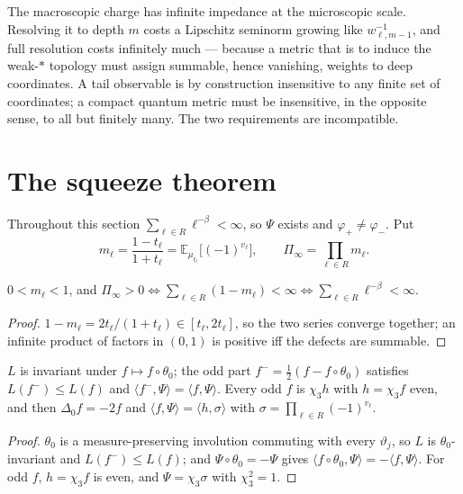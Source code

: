 \begin{remark}[Interpretation]\label{IV:rem:impedance}
The macroscopic charge has infinite impedance at the microscopic scale. Resolving it to depth
$m$ costs a Lipschitz seminorm growing like $w_{\ell,m-1}^{-1}$, and full resolution costs
infinitely much --- because a metric that is to induce the weak-$*$ topology must assign
summable, hence vanishing, weights to deep coordinates. A tail observable is by construction
insensitive to any finite set of coordinates; a compact quantum metric must be insensitive,
in the opposite sense, to all but finitely many. The two requirements are incompatible.
\end{remark}

\section{The squeeze theorem}

Throughout this section $\sum_{\ell\in R}\ell^{-\beta}<\infty$, so $\Psi$ exists and
$\varphi_+\ne\varphi_-$. Put
\begin{equation}\label{IV:eq:Pi}
m_\ell=\frac{1-t_\ell}{1+t_\ell}=\mathbb E_{\mu_{t_\ell}}\bigl[(-1)^{v_\ell}\bigr],
\qquad \Pi_\infty=\prod_{\ell\in R}m_\ell .
\end{equation}

\begin{lemma}\label{IV:lem:kakutani}
$0<m_\ell<1$, and $\Pi_\infty>0\iff\sum_{\ell\in R}(1-m_\ell)<\infty\iff\sum_{\ell\in R}\ell^{-\beta}<\infty$.
\end{lemma}

\begin{proof}
$1-m_\ell=2t_\ell/(1+t_\ell)\in[t_\ell,2t_\ell]$, so the two series converge together; an
infinite product of factors in $(0,1)$ is positive iff the defects are summable.
\end{proof}

\begin{lemma}\label{IV:lem:odd}
$L$ is invariant under $f\mapsto f\circ\theta_0$; the odd part
$f^-=\tfrac12(f-f\circ\theta_0)$ satisfies $L(f^-)\le L(f)$ and
$\langle f^-,\Psi\rangle=\langle f,\Psi\rangle$. Every odd $f$ is $\chi_3h$ with
$h=\chi_3f$ even, and then $\Delta_0f=-2f$ and
$\langle f,\Psi\rangle=\langle h,\sigma\rangle$ with $\sigma=\prod_{\ell\in R}(-1)^{v_\ell}$.
\end{lemma}

\begin{proof}
$\theta_0$ is a measure-preserving involution commuting with every $\vartheta_j$, so $L$ is
$\theta_0$-invariant and $L(f^-)\le L(f)$; and $\Psi\circ\theta_0=-\Psi$ gives
$\langle f\circ\theta_0,\Psi\rangle=-\langle f,\Psi\rangle$. For odd $f$, $h=\chi_3f$ is
even, and $\Psi=\chi_3\sigma$ with $\chi_3^2=1$.
\end{proof}

